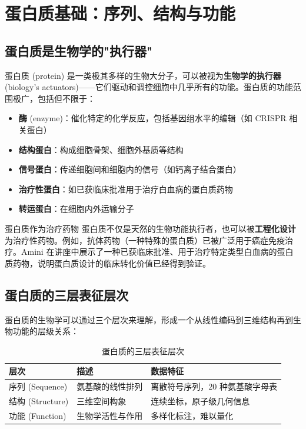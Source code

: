 \section{蛋白质基础：序列、结构与功能}

\subsection{蛋白质是生物学的"执行器"}

蛋白质 (protein) 是一类极其多样的生物大分子，可以被视为\textbf{生物学的执行器} (biology's actuators)——它们驱动和调控细胞中几乎所有的功能。蛋白质的功能范围极广，包括但不限于：

\begin{itemize}
    \item \textbf{酶} (enzyme)：催化特定的化学反应，包括基因组水平的编辑（如 CRISPR 相关蛋白）
    \item \textbf{结构蛋白}：构成细胞骨架、细胞外基质等结构
    \item \textbf{信号蛋白}：传递细胞间和细胞内的信号（如钙离子结合蛋白）
    \item \textbf{治疗性蛋白}：如已获临床批准用于治疗白血病的蛋白质药物
    \item \textbf{转运蛋白}：在细胞内外运输分子
\end{itemize}

\begin{knowledgebox}{蛋白质作为治疗药物}
蛋白质不仅是天然的生物功能执行者，也可以被\textbf{工程化设计}为治疗性药物。例如，抗体药物（一种特殊的蛋白质）已被广泛用于癌症免疫治疗。Amini 在讲座中展示了一种已获临床批准、用于治疗特定类型白血病的蛋白质药物，说明蛋白质设计的临床转化价值已经得到验证。
\end{knowledgebox}

\subsection{蛋白质的三层表征层次}

蛋白质的生物学可以通过三个层次来理解，形成一个从线性编码到三维结构再到生物功能的层级关系：

\begin{table}[H]
\centering
\caption{蛋白质的三层表征层次}
\begin{tabular}{@{}lll@{}}
\toprule
\textbf{层次} & \textbf{描述} & \textbf{数据特征} \\
\midrule
序列 (Sequence) & 氨基酸的线性排列 & 离散符号序列，20 种氨基酸字母表 \\
结构 (Structure) & 三维空间构象 & 连续坐标，原子级几何信息 \\
功能 (Function) & 生物学活性与作用 & 多样化标注，难以量化 \\
\bottomrule
\end{tabular}
\end{table}

